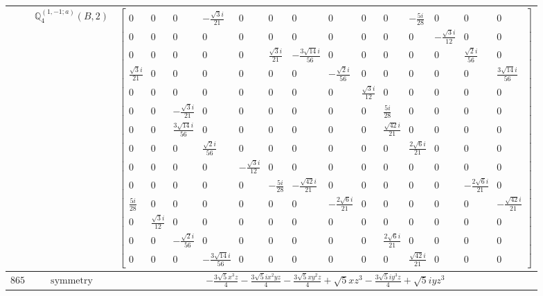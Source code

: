 \documentclass[fleqn,8pt,landscape]{jsarticle}
\begin{document}
\begin{longtable}{ccc}
$  $ & $ \mathbb{Q}_{4}^{(1,-1;a)}(B,2) $ & $ \begin{bmatrix} 0 & 0 & 0 & - \frac{\sqrt{3} i}{21} & 0 & 0 & 0 & 0 & 0 & 0 & - \frac{5 i}{28} & 0 & 0 & 0 \\ 0 & 0 & 0 & 0 & 0 & 0 & 0 & 0 & 0 & 0 & 0 & - \frac{\sqrt{3} i}{12} & 0 & 0 \\ 0 & 0 & 0 & 0 & 0 & \frac{\sqrt{3} i}{21} & - \frac{3 \sqrt{14} i}{56} & 0 & 0 & 0 & 0 & 0 & \frac{\sqrt{2} i}{56} & 0 \\ \frac{\sqrt{3} i}{21} & 0 & 0 & 0 & 0 & 0 & 0 & - \frac{\sqrt{2} i}{56} & 0 & 0 & 0 & 0 & 0 & \frac{3 \sqrt{14} i}{56} \\ 0 & 0 & 0 & 0 & 0 & 0 & 0 & 0 & \frac{\sqrt{3} i}{12} & 0 & 0 & 0 & 0 & 0 \\ 0 & 0 & - \frac{\sqrt{3} i}{21} & 0 & 0 & 0 & 0 & 0 & 0 & \frac{5 i}{28} & 0 & 0 & 0 & 0 \\ 0 & 0 & \frac{3 \sqrt{14} i}{56} & 0 & 0 & 0 & 0 & 0 & 0 & \frac{\sqrt{42} i}{21} & 0 & 0 & 0 & 0 \\ 0 & 0 & 0 & \frac{\sqrt{2} i}{56} & 0 & 0 & 0 & 0 & 0 & 0 & \frac{2 \sqrt{6} i}{21} & 0 & 0 & 0 \\ 0 & 0 & 0 & 0 & - \frac{\sqrt{3} i}{12} & 0 & 0 & 0 & 0 & 0 & 0 & 0 & 0 & 0 \\ 0 & 0 & 0 & 0 & 0 & - \frac{5 i}{28} & - \frac{\sqrt{42} i}{21} & 0 & 0 & 0 & 0 & 0 & - \frac{2 \sqrt{6} i}{21} & 0 \\ \frac{5 i}{28} & 0 & 0 & 0 & 0 & 0 & 0 & - \frac{2 \sqrt{6} i}{21} & 0 & 0 & 0 & 0 & 0 & - \frac{\sqrt{42} i}{21} \\ 0 & \frac{\sqrt{3} i}{12} & 0 & 0 & 0 & 0 & 0 & 0 & 0 & 0 & 0 & 0 & 0 & 0 \\ 0 & 0 & - \frac{\sqrt{2} i}{56} & 0 & 0 & 0 & 0 & 0 & 0 & \frac{2 \sqrt{6} i}{21} & 0 & 0 & 0 & 0 \\ 0 & 0 & 0 & - \frac{3 \sqrt{14} i}{56} & 0 & 0 & 0 & 0 & 0 & 0 & \frac{\sqrt{42} i}{21} & 0 & 0 & 0 \end{bmatrix} $ \\ \hline
$ 865 $ & $ \text{symmetry} $ & $ - \frac{3 \sqrt{5} x^{3} z}{4} - \frac{3 \sqrt{5} i x^{2} y z}{4} - \frac{3 \sqrt{5} x y^{2} z}{4} + \sqrt{5} x z^{3} - \frac{3 \sqrt{5} i y^{3} z}{4} + \sqrt{5} i y z^{3} $ \\

\end{longtable}
\end{document}
